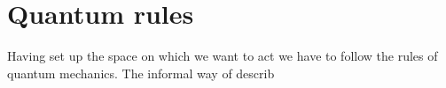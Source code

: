 \section{Quantum rules}
Having set up the space on which we want to act we have to follow the rules of quantum mechanics. The informal way of describ